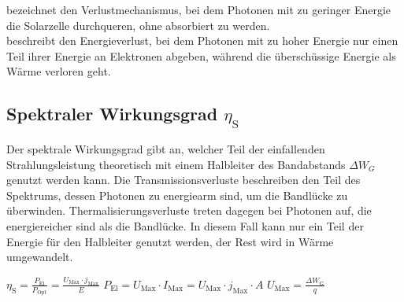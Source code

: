 \vspace{0.1cm}

 bezeichnet den Verlustmechanismus, bei dem Photonen mit zu geringer Energie die Solarzelle durchqueren, ohne absorbiert zu werden.\\
 beschreibt den Energieverlust, bei dem Photonen mit zu hoher Energie nur einen Teil ihrer Energie an Elektronen abgeben, während die überschüssige Energie als Wärme verloren geht.



\subsection{Spektraler Wirkungsgrad $\eta_\text{S}$}

Der spektrale Wirkungsgrad gibt an, welcher Teil der einfallenden Strahlungsleistung theoretisch mit einem Halbleiter des Bandabstands \( \Delta W_G \) genutzt werden kann. Die Transmissionsverluste beschreiben den Teil des Spektrums, dessen Photonen zu energiearm sind, um die Bandlücke zu überwinden. Thermalisierungsverluste treten dagegen bei Photonen auf, die energiereicher sind als die Bandlücke. In diesem Fall kann nur ein Teil der Energie für den Halbleiter genutzt werden, der Rest wird in Wärme umgewandelt.


\vspace{0.1cm}

$
\boxed{
\eta_\text{S} = \frac{P_\text{El}}{P_\text{Opt}} = \frac{U_\text{Max} \cdot j_\text{Max}}{E}
}$
$
\boxed{
P_\text{El} = U_\text{Max} \cdot I_\text{Max} = U_\text{Max} \cdot j_\text{Max} \cdot A
}$
$
\boxed{
U_\text{Max} = \frac{\Delta W_\text{G}}{q}
}
$

\vspace{0.1cm}

